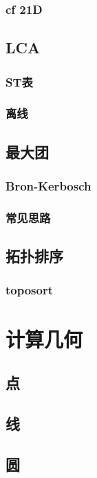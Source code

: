 \documentclass[10pt,a4paper]{article}
\begin{document}
\subsubsection{cf 21D}

\subsection{LCA}
\subsubsection{ST表}

\subsubsection{离线}

\subsection{最大团}
\subsubsection{Bron-Kerbosch}

\subsubsection{常见思路}

\subsection{拓扑排序}
\subsubsection{toposort}

\section{计算几何}
\subsection{点}

\subsection{线}

\subsection{圆}

\end{document}
